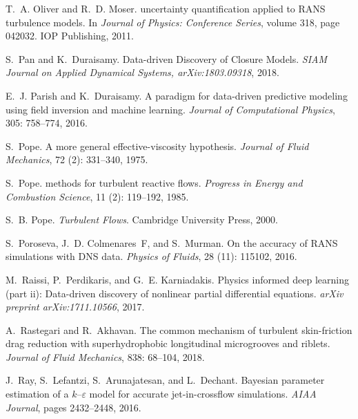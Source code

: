 \documentclass[a4paper]{ar-1col}
\begin{document}
\begin{thebibliography}{82}
T.~A. Oliver and R.~D. Moser.
 uncertainty quantification applied to {RANS} turbulence
  models.
\newblock In \emph{Journal of Physics: Conference Series}, volume 318, page
  042032. IOP Publishing, 2011.

S.~Pan and K.~Duraisamy.
\newblock Data-driven Discovery of Closure Models.
\newblock \emph{SIAM Journal on Applied Dynamical Systems, arXiv:1803.09318}, 2018.

E.~J. Parish and K.~Duraisamy.
\newblock A paradigm for data-driven predictive modeling using field inversion
  and machine learning.
\newblock \emph{Journal of Computational Physics}, 305: 758--774,
  2016.

S.~Pope.
\newblock A more general effective-viscosity hypothesis.
\newblock \emph{Journal of Fluid Mechanics}, 72 (2):
  331--340, 1975.

S.~Pope.
 methods for turbulent reactive flows.
\newblock \emph{Progress in Energy and Combustion Science}, 11
  (2): 119--192, 1985.

S.~B. Pope.
\newblock \emph{Turbulent Flows}.
\newblock Cambridge University Press, 2000.

S.~Poroseva, J.~D. Colmenares~F, and S.~Murman.
\newblock On the accuracy of {RANS} simulations with {DNS} data.
\newblock \emph{Physics of Fluids}, 28 (11): 115102, 2016.

M.~Raissi, P.~Perdikaris, and G.~E. Karniadakis.
\newblock Physics informed deep learning (part ii): Data-driven discovery of
  nonlinear partial differential equations.
\newblock \emph{arXiv preprint arXiv:1711.10566}, 2017.

A.~Rastegari and R.~Akhavan.
\newblock The common mechanism of turbulent skin-friction drag reduction with
  superhydrophobic longitudinal microgrooves and riblets.
\newblock \emph{Journal of Fluid Mechanics}, 838: 68--104, 2018.

J.~Ray, S.~Lefantzi, S.~Arunajatesan, and L.~Dechant.
\newblock Bayesian parameter estimation of a $k$--$\varepsilon$ model for
  accurate jet-in-crossflow simulations.
\newblock \emph{AIAA Journal}, pages 2432--2448, 2016.


\end{thebibliography}
\end{document}
